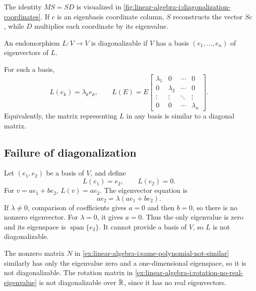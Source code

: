The identity \(MS=SD\) is visualized in
\autoref{fig:linear-algebra-i:diagonalization-coordinates}.
If \(c\) is an eigenbasis coordinate column, \(S\) reconstructs the vector
\(Sc\), while \(D\) multiplies each coordinate by its eigenvalue.

\begin{definition}
  An endomorphism \(L:V\to V\) is diagonalizable if \(V\) has a basis
  \((e_1,\ldots,e_n)\) of eigenvectors of \(L\).
\end{definition}

For such a basis,
\[
  L(e_k)=\lambda_ke_k,\qquad
  L(E)=E\begin{bmatrix}
    \lambda_1&0&\cdots&0\\
    0&\lambda_2&\cdots&0\\
    \vdots&\vdots&\ddots&\vdots\\
    0&0&\cdots&\lambda_n
  \end{bmatrix}.
\]
Equivalently, the matrix representing \(L\) in any basis is similar
to a diagonal matrix.

\subsection{Failure of diagonalization}

\begin{example}
  Let \((e_1,e_2)\) be a basis of \(V\), and define
  \[
    L(e_1)=e_2,\qquad L(e_2)=0.
  \]
  For \(v=ae_1+be_2\), \(L(v)=ae_2\). The eigenvector equation is
  \[
    ae_2=\lambda(ae_1+be_2).
  \]
  If \(\lambda\ne0\), comparison of coefficients gives \(a=0\)
  and then \(b=0\), so there is no nonzero eigenvector. For
  \(\lambda=0\), it gives \(a=0\). Thus the only eigenvalue is zero
  and its eigenspace is \(\operatorname{span}\{e_2\}\). It cannot
  provide a basis of \(V\), so \(L\) is not diagonalizable.
\end{example}

The nonzero matrix \(N\) in
\autoref{ex:linear-algebra-i:same-polynomial-not-similar} similarly has
only the eigenvalue zero and a one-dimensional eigenspace, so it is not
diagonalizable. The rotation matrix in
\autoref{ex:linear-algebra-i:rotation-no-real-eigenvalue} is not
diagonalizable over \(\mathbb{R}\), since it has no real eigenvectors.


